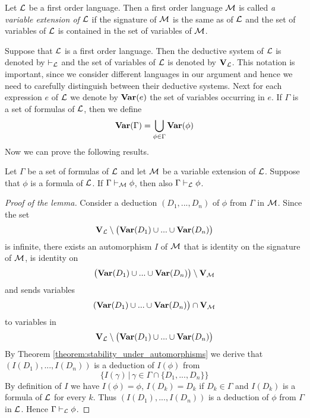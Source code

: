\documentclass[10pt]{amsart}
\begin{document}
\begin{definition}
	Let ${\mathcal L}$ be a first order language. Then a first order language ${\mathcal M}$ is called \textit{a variable extension of ${\mathcal L}$} if the signature of ${\mathcal M}$ is the same as of ${\mathcal L}$ and the set of variables of ${\mathcal L}$ is contained in the set of variables of ${\mathcal M}$.
\end{definition}
\noindent
Suppose that ${\mathcal L}$ is a first order language. Then the deductive system of ${\mathcal L}$ is denoted by $\vdash_{{\mathcal L}}$ and the set of variables of ${\mathcal L}$ is denoted by $\mathbf{V}_{\mathcal L}$. This notation is important, since we consider different languages in our argument and hence we need to carefully distinguish between their deductive systems. Next for each expression $e$ of ${\mathcal L}$ we denote by $\mathbf{Var}(e)$ the set of variables occurring in $e$. If $\Gamma$ is a set of formulas of ${\mathcal L}$, then we define
$$\mathbf{Var}(\Gamma) = \bigcup_{\phi \in \Gamma} \mathbf{Var}(\phi)$$
Now we can prove the following results.

\begin{lemma}\label{lemma:deduction_in_variable_extensions_of_a_formula_that_belongs_to_extended_language}
	Let $\Gamma$ be a set of formulas of ${\mathcal L}$ and let ${\mathcal M}$ be a variable extension of ${\mathcal L}$. Suppose that $\phi$ is a formula of ${\mathcal L}$. If $\Gamma \vdash_{{\mathcal M}} \phi$, then also $\Gamma \vdash_{{\mathcal L}} \phi$.
\end{lemma}
\begin{proof}[Proof of the lemma]
	Consider a deduction $(D_1, ..., D_n)$ of $\phi$ from $\Gamma$ in ${\mathcal M}$. Since the set
	$$\mathbf{V}_{{\mathcal L}} \setminus \big(\mathbf{Var}(D_1) \cup ... \cup \mathbf{Var}(D_n)\big)$$
	is infinite, there exists an automorphism $I$ of ${\mathcal M}$ that is identity on the signature of ${\mathcal M}$, is identity on
	$$\big(\mathbf{Var}(D_1) \cup ... \cup \mathbf{Var}(D_n)\big) \setminus \mathbf{V}_{{\mathcal M}}$$
	and sends variables
	$$(\mathbf{Var}(D_1) \cup ... \cup \mathbf{Var}(D_n)\big) \cap \mathbf{V}_{{\mathcal M}}$$
	to variables in
	$$\mathbf{V}_{{\mathcal L}} \setminus \big(\mathbf{Var}(D_1) \cup ... \cup \mathbf{Var}(D_n)\big)$$
	By Theorem \ref{theorem:stability_under_automorphisms} we derive that $(I(D_1),...,I(D_n))$ is a deduction of $I(\phi)$ from
	$$\big\{I(\gamma)\,\big|\,\gamma \in \Gamma \cap \{D_1,...,D_n\}\big\}$$
	By definition of $I$ we have $I(\phi) = \phi$, $I(D_k) = D_k$ if $D_k \in \Gamma$ and $I(D_k)$ is a formula of ${\mathcal L}$ for every $k$. Thus $\left(I(D_1),...,I(D_n)\right)$ is a deduction of $\phi$ from $\Gamma$ in ${\mathcal L}$. Hence $\Gamma \vdash_{{\mathcal L}} \phi$.
\end{proof}
\end{document}
